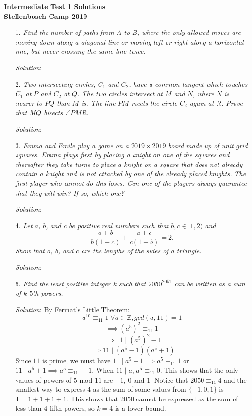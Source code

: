 \documentclass{article}
\begin{document}
\begin{center}
  \textbf{\Large Intermediate Test 1 Solutions}
  \\ \vspace{1em}
  \textbf{\large Stellenbosch Camp 2019}
\end{center}


\begin{enumerate}[1.]

\item[1.] %
\textit{Find the number of paths from $A$ to $B$, where the only allowed moves are moving down along a diagonal line or moving left or right along a horizontal line, but never crossing the same line twice.}

\textit{Solution}:


\item[2.] %
\textit{Two intersecting circles, $C_1$ and $C_2$, have a common tangent which touches $C_1$ at $P$ and $C_2$ at $Q$. The two circles intersect at $M$ and $N$, where $N$ is nearer to $PQ$ than $M$ is. The line $PM$ meets the circle $C_2$ again at $R$. Prove that $MQ$ bisects $\angle PMR$.}

\textit{Solution}:


\item[3.] %
\textit{Emma and Emile play a game on a $2019 \times 2019$ board made up of unit grid squares. Emma plays first by placing a knight on one of the squares and thereafter they take turns to place a knight on a square that does not already contain a knight and is not attacked by one of the already placed knights. The first player who cannot do this loses. Can one of the players always guarantee that they will win? If so, which one? }

\textit{Solution}:


\item[4.] %
\textit{Let $a$, $b$, and $c$ be positive real numbers such that $b, c \in [1,2)$ and
\[ \frac{a+b}{b(1+c)} +\frac{a+c}{c(1+b)} = 2. \]
Show that $a$, $b$, and $c$ are the lengths of the sides of a triangle.}

\textit{Solution}:


\item[5.] %
\textit{Find the least positive integer $k$ such that $2050^{2051}$ can be written as a sum of $k$ $5$th powers.}

\textit{Solution}: 
By Fermat's Little Theorem: 
$$a^{10} \equiv _{11} 1 \; \forall a \in \mathbb{Z}, gcd(a, 11) = 1$$ 
$$\implies (a^5)^2 \equiv _{11} 1$$
$$\implies 11 \; | \; (a^5)^2 - 1$$
$$\implies 11 \; | \; (a^5 - 1)(a^5 + 1)$$
Since $11$ is prime, we must have $11 \; | \; a^5 - 1 \implies a^5 \equiv _{11} 1$ or $11 \; | \; a^5 + 1 \implies a^5 \equiv _{11} -1$. When $11 \; | \; a$, $a^5 \equiv _{11} 0$.
This shows that the only values of powers of $5$ mod $11$ are $-1$, $0$ and $1$. Notice that $2050 \equiv _{11} 4$ and the smallest way to express $4$ as the sum of some values from $\{-1, 0, 1\}$ is $4 = 1 + 1 + 1 + 1$.
This shows that 2050 cannot be expressed as the sum of less than $4$ fifth powers, so $k = 4$ is a lower bound.


\end{enumerate}
\end{document}
